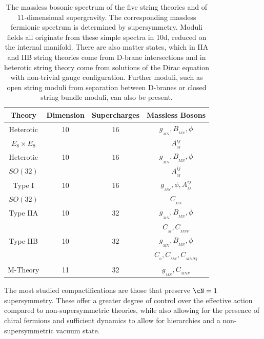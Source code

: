 \begin{table}[H]
\begin{center}
\centering
\begin{tabular}{ | c | c | c | c | }
\hline
\cellcolor[gray]{0.9}  {\bf Theory} &  \cellcolor[gray]{0.9} {\bf Dimension } &  \cellcolor[gray]{0.9} {\bf Supercharges} &  \cellcolor[gray]{0.9} {\bf Massless Bosons}   \\
\hline \hline 
{Heterotic}   & 10  & 16  & $g_{_{MN}}, B_{_{MN}}, \phi $  \\
$E_8 \times E_8$ & & &$A_{_M}^{ij}$ \\
\hline
{Heterotic}   & 10  & 16  & $g_{_{MN}}, B_{_{MN}}, \phi $  \\
$SO(32)$ & & &$A_{_M}^{ij}$ \\
\hline
{Type I}   & 10  & 16  & $g_{_{MN}},  \phi, A_{_M}^{ij} $  \\
$SO(32)$ & & &$C_{_{MN}}$ \\
\hline
{Type IIA}   & 10  & 32  & $g_{_{MN}}, B_{_{MN}}, \phi $  \\
& & &$C_{_M}, C_{_{MNP}}$ \\
\hline
{Type IIB}   & 10  & 32  & $g_{_{MN}}, B_{_{MN}},\phi $  \\
& & &$C_{_0}, C_{_{MN}}, C_{_{MNPQ}}$ \\
\hline
{M-Theory}   & 11  & 32  & $g_{_{MN}}, C_{_{MNP}}$ \\
\hline
\end{tabular}
\end{center} 
\caption {\footnotesize{The massless bosonic spectrum of the five string theories and of $11$-dimensional supergravity. The corresponding massless fermionic spectrum is determined by supersymmetry. Moduli fields all originate from these simple spectra in 10d, reduced on the internal manifold. There are also matter states, which in IIA and IIB string theories come from D-brane intersections and in heterotic string theory come from solutions of the Dirac equation with non-trivial gauge configuration. Further moduli, such as open string moduli from separation between D-branes or closed string bundle moduli, can also be present.} }
\label{tab:boson_spectrum}
\end{table}

The most studied compactifications are those that preserve $\cN=1$ supersymmetry. These offer a greater degree of control over the effective action compared to non-supersymmetric theories, while also allowing for the presence of chiral fermions and sufficient dynamics to 
allow for hierarchies and a non-supersymmetric vacuum state.

